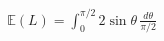 \documentclass[preview]{standalone}
\begin{document}
\begin{align*}
\mathbb{E}(L) = \int_0^{\pi/2}2\sin\theta\,\frac{d\theta}{\pi/2}
\end{align*}
\end{document}
